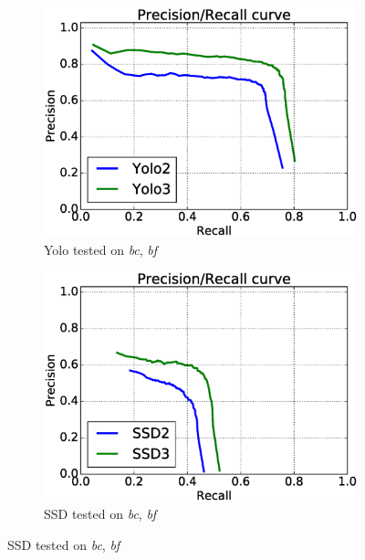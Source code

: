 \begin{figure}[h!]
\begin{subfigure}{.5\textwidth}
  \centering
  \includegraphics[width=0.8\linewidth]{results/case_buildings/prec_recall/yolo/bcbf.eps}
  \caption{Yolo tested on \textit{bc}, \textit{bf}}
  \label{fig:sfig1}
\end{subfigure}%
\begin{subfigure}{.5\textwidth}
  \centering
  \includegraphics[width=.8\linewidth]{results/case_buildings/prec_recall/ssd/bcbf.eps}
  \caption{SSD tested on \textit{bc}, \textit{bf}}
  \label{fig:sfig2}
\end{subfigure}


\end{figure}
